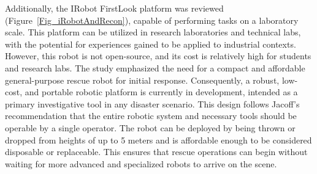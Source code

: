 \documentclass[conference]{IEEEtran}
\begin{document}
Additionally, the IRobot FirstLook platform was reviewed (Figure~\ref{Fig_iRobotAndRecon}), capable of performing tasks on a laboratory scale. This platform can be utilized in research laboratories and technical labs, with the potential for experiences gained to be applied to industrial contexts. However, this robot is not open-source, and its cost is relatively high for students and research labs. The study emphasized the need for a compact and affordable general-purpose rescue robot for initial response. Consequently, a robust, low-cost, and portable robotic platform is currently in development, intended as a primary investigative tool in any disaster scenario. This design follows Jacoff's recommendation that the entire robotic system and necessary tools should be operable by a single operator. The robot can be deployed by being thrown or dropped from heights of up to 5 meters and is affordable enough to be considered disposable or replaceable. This ensures that rescue operations can begin without waiting for more advanced and specialized robots to arrive on the scene.
\end{document}

